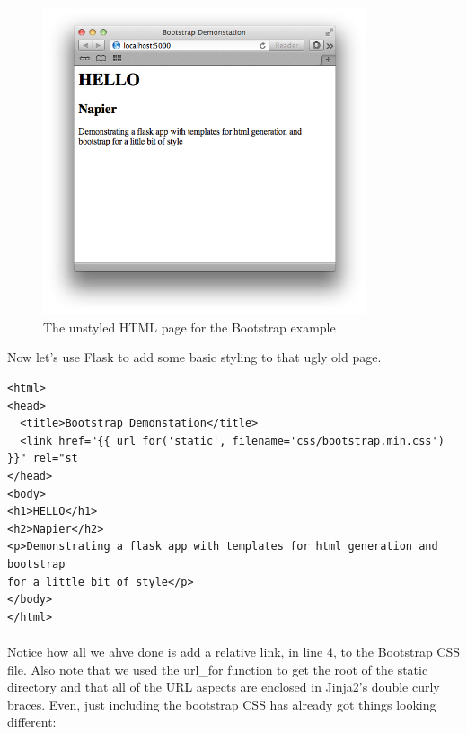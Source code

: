 \documentclass[12pt, a4paper, twoside]{book}
\begin{document}
\begin{figure}[H]
\centering
\includegraphics[width=0.85\textwidth]{images/unstyled.png}
\caption{The unstyled HTML page for the Bootstrap example}
\label{fig:unstyled}
\end{figure}

Now let's use Flask to add some basic styling to that ugly old page.

\begin{lstlisting}
<html>
<head>
  <title>Bootstrap Demonstation</title>
  <link href="{{ url_for('static', filename='css/bootstrap.min.css') }}" rel="st
</head>
<body>
<h1>HELLO</h1>
<h2>Napier</h2>
<p>Demonstrating a flask app with templates for html generation and bootstrap
for a little bit of style</p>
</body>
</html>
\end{lstlisting}

\paragraph{} Notice how all we ahve done is add a relative link, in line 4, to the Bootstrap CSS file. Also note that we used the url\_for function to get the root of the static directory and that all of the URL aspects are enclosed in Jinja2's double curly braces.  Even, just including the bootstrap CSS has already got things looking different:
\end{document}
